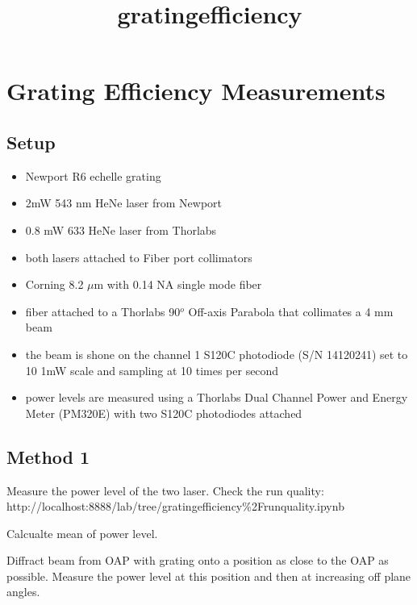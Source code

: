 \documentclass[11pt]{article}
\title{gratingefficiency}
\providecommand{\tightlist}{%
      \setlength{\itemsep}{0pt}\setlength{\parskip}{0pt}}
\begin{document}
    
    
    \maketitle
    
    

    
    \section{Grating Efficiency
Measurements}\label{grating-efficiency-measurements}

\subsection{Setup}\label{setup}

\begin{itemize}
\tightlist
\item
  Newport R6 echelle grating
\item
  2mW 543 nm HeNe laser from Newport
\item
  0.8 mW 633 HeNe laser from Thorlabs
\item
  both lasers attached to Fiber port collimators
\item
  Corning 8.2 \(\mu\)m with 0.14 NA single mode fiber
\item
  fiber attached to a Thorlabs 90\(^o\) Off-axis Parabola that
  collimates a 4 mm beam
\item
  the beam is shone on the channel 1 S120C photodiode (S/N 14120241) set
  to 10 1mW scale and sampling at 10 times per second
\item
  power levels are measured using a Thorlabs Dual Channel Power and
  Energy Meter (PM320E) with two S120C photodiodes attached
\end{itemize}

\subsection{Method 1}\label{method-1}

Measure the power level of the two laser. Check the run quality:
http://localhost:8888/lab/tree/gratingefficiency\%2Frunquality.ipynb

Calcualte mean of power level.

Diffract beam from OAP with grating onto a position as close to the OAP
as possible. Measure the power level at this position and then at
increasing off plane angles.
\end{document}
